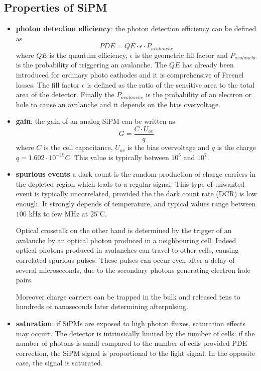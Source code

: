 \subsection{Properties of SiPM}
\begin{itemize}
\item \textbf{photon detection efficiency}: the photon detection efficiency can be defined as
\begin{equation}
PDE = QE \cdot \epsilon \cdot P_{avalanche}
\end{equation}
where $QE$ is the quantum efficiency, $\epsilon$ is the geometric fill factor and $P_{avalanche}$ is the probability of triggering an avalanche.
The $QE$ has already been introduced for ordinary photo cathodes and it is comprehensive of Fresnel losses.
The fill factor $\epsilon$ is defined as the ratio of the sensitive area to the total area of the detector.
Finally the $P_{avalanche}$ is the probability of an electron or hole to cause an avalanche and it depends on the bias overvoltage.

\item \textbf{gain}: the gain of an analog SiPM can be written as
\begin{equation}
G = \frac{C\cdot U_{ov}}{q}
\end{equation}
where $C$ is the cell capacitance, $U_{ov}$ is the bias overvoltage and $q$ is the charge $q = 1.602 \cdot 10^{-19} C$.
This value is typically between $10^{5}$ and $10^{7}$.

\item \textbf{spurious events} a dark count is the random production of charge carriers in the depleted region which leads to a regular signal. This type of unwanted event is typically uncorrelated, provided the the dark count rate (DCR) is low enough. It strongly depends of temperature, and typical values range between $100$ kHz to few MHz at $25^{\circ}$C.

Optical crosstalk on the other hand is determined by the trigger of an avalanche by an optical photon produced in a neighbouring cell. Indeed optical photons produced in avalanches can travel to other cells, causing correlated spurious pulses. These pulses can occur even after a delay of several microseconds, due to the secondary photons generating electron hole pairs.

Moreover charge carriers can be trapped in the bulk and released tens to hundreds of nanoseconds later determining afterpulsing.

\item \textbf{saturation}: if SiPMs are exposed to high photon fluxes, saturation effects may occurr. The detector is intrinsically limited by the number of cells: if the number of photons is small compared to the number of cells provided PDE correction, the SiPM signal is proportional to the light signal. In the opposite case, the signal is saturated.
\end{itemize}

